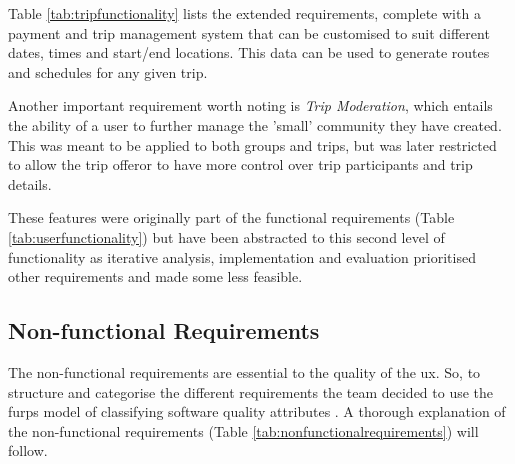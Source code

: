 \documentclass{article}
\begin{document}
    Table \ref{tab:tripfunctionality} lists the extended requirements, complete with a payment and trip management system that can be customised to suit different dates, times and start/end locations. This data can be used to generate routes and schedules for any given trip. 
    
    Another important requirement worth noting is \emph{Trip Moderation}, which entails the ability of a user to further manage the 'small' community they have created. This was meant to be applied to both groups and trips, but was later restricted to allow the trip offeror to have more control over trip participants and trip details. \par
    
    These features were originally part of the functional requirements (Table \ref{tab:userfunctionality}) but have been abstracted to this second level of functionality as iterative analysis, implementation and evaluation prioritised other requirements and made some less feasible. \par
    

    \subsection{Non-functional Requirements}
    \label{subsec:nonfunctionalreq}
    The non-functional requirements are essential to the quality of the \acrshort{ux}. So, to structure and categorise the different requirements the team decided to use the \acrshort{furps} model of classifying software quality attributes \cite{furpslecture}. A thorough explanation of the non-functional requirements (Table \ref{tab:nonfunctionalrequirements}) will follow. \par
    
\end{document}

